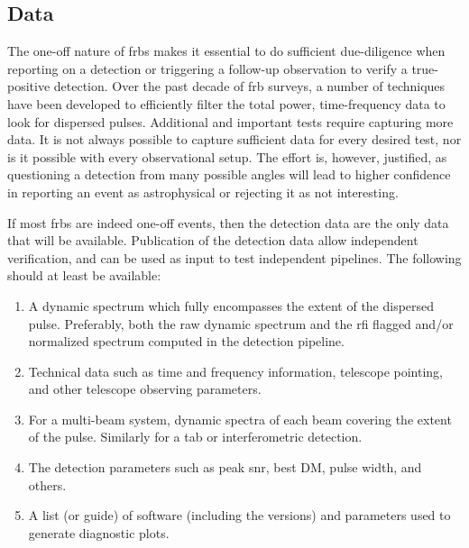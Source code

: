 \documentclass[a4paper,fleqn,usenatbib]{mnras}
\begin{document}
\subsection{Data}
\label{sec:detect_report}

The one-off nature of \glspl{frb} makes it essential to do sufficient
due-diligence when reporting on a detection or triggering a follow-up
observation to verify a true-positive detection. Over the past decade of
\gls{frb} surveys, a number of techniques have been developed to efficiently
filter the total power, time-frequency data to look for dispersed pulses.
Additional and important tests require capturing more data. It is not always
possible to capture sufficient data for every desired test, nor is it possible
with every observational setup.  The effort is, however, justified, as
questioning a detection from many possible angles will lead to higher confidence
in reporting an event as astrophysical or rejecting it as not interesting. 

If most \glspl{frb} are indeed one-off events, then the detection data are the
only data that will be available. Publication of the detection data allow
independent verification, and can be used as input to test independent
pipelines. The following should at least be available:

\begin{enumerate}
    \item A dynamic spectrum which fully encompasses the extent of the dispersed
    pulse. Preferably, both the raw dynamic spectrum and the \gls{rfi} flagged
    and/or normalized spectrum computed in the detection pipeline.
    \item Technical data such as time and frequency information, telescope
    pointing, and other telescope observing parameters.
    \item For a multi-beam system, dynamic spectra of each beam covering the
    extent of the pulse. Similarly for a \gls{tab} or interferometric detection.
    \item The detection parameters such as peak \gls{snr}, best DM, pulse width,
    and others.
    \item A list (or guide) of software (including the versions) and parameters
    used to generate diagnostic plots.
\end{enumerate}
\end{document}
